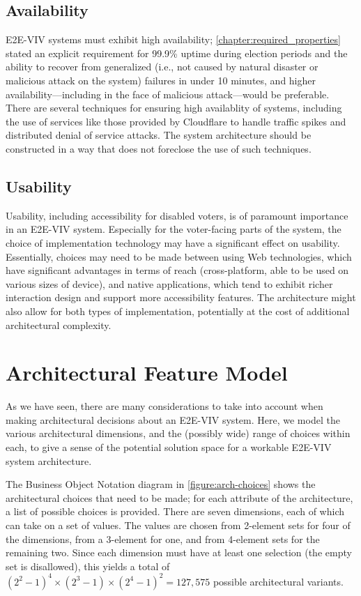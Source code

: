 \subsection{Availability}

E2E-VIV systems must exhibit high availability;
\autoref{chapter:required_properties} stated an explicit requirement
for 99.9\% uptime during election periods and the ability to recover
from generalized (i.e., not caused by natural disaster or malicious
attack on the system) failures in under 10 minutes, and higher
availability---including in the face of malicious attack---would be
preferable. There are several techniques for ensuring high
availablity of systems, including the use of services like those
provided by Cloudflare to handle traffic spikes and distributed denial
of service attacks. The system architecture should be constructed in a
way that does not foreclose the use of such techniques.

\subsection{Usability}

Usability, including accessibility for disabled voters, is of
paramount importance in an E2E-VIV system. Especially for the
voter-facing parts of the system, the choice of implementation
technology may have a significant effect on usability. Essentially,
choices may need to be made between using Web technologies, which have
significant advantages in terms of reach (cross-platform, able to be
used on various sizes of device), and native applications, which tend
to exhibit richer interaction design and support more accessibility
features. The architecture might also allow for both types of
implementation, potentially at the cost of additional architectural
complexity.

\section{Architectural Feature Model}

As we have seen, there are many considerations to take into account
when making architectural decisions about an E2E-VIV system. Here, we
model the various architectural dimensions, and the (possibly wide)
range of choices within each, to give a sense of the potential
solution space for a workable E2E-VIV system architecture.

The Business Object Notation diagram in \autoref{figure:arch-choices}
shows the architectural choices that need to be made; for each
attribute of the architecture, a list of possible choices is
provided. There are seven dimensions, each of which can take on a set
of values. The values are chosen from 2-element sets for four of the
dimensions, from a 3-element for one, and from 4-element sets for the
remaining two. Since each dimension must have at least one selection
(the empty set is disallowed), this yields a total of
$(2^2-1)^4\times(2^3-1)\times(2^4-1)^2=127,\!575$ possible
architectural variants.

